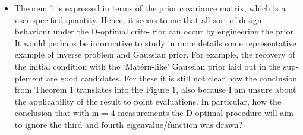\documentclass{amsart}
\begin{document}
\begin{itemize}
\item Theorem 1 is expressed in terms of the prior covariance matrix,
  which is a user specified quantity. Hence, it seems to me that all
  sort of design behaviour under the D-optimal crite- rior can occur
  by engineering the prior. It would perhaps be informative to study
  in more details some representative example of inverse problem and
  Gaussian prior. For example, the recovery of the initial condition
  with the ‘Matérn-like’ Gaussian prior laid out in the sup- plement
  are good candidates. For these it is still not clear how the
  conclusion from Theorem 1 translates into the Figure 1, also because
  I am unsure about the applicability of the result to point
  evaluations. In particular, how the conclusion that with m = 4
  measurements the D-optimal procedure will aim to ignore the third
  and fourth eigenvalue/function was drawn?
\end{itemize}
\end{document}
